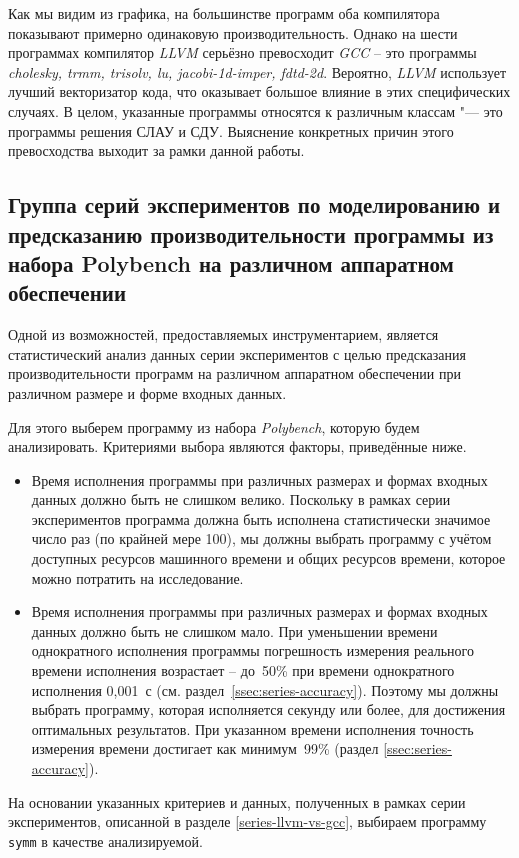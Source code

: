 Как мы видим из графика, на большинстве программ оба компилятора показывают примерно одинаковую производительность. Однако на шести программах компилятор \textit{LLVM} серьёзно превосходит \textit{GCC} -- это программы \textit{cholesky, trmm, trisolv, lu, jacobi-1d-imper, fdtd-2d}. Вероятно, \textit{LLVM} использует лучший векторизатор кода, что оказывает большое влияние в этих специфических случаях. В целом, указанные программы относятся к различным классам "--- это программы решения СЛАУ и СДУ. Выяснение конкретных причин этого превосходства выходит за рамки данной работы.

\subsection{Группа серий экспериментов по моделированию и предсказанию производительности программы из набора Polybench на различном аппаратном обеспечении}

Одной из возможностей, предоставляемых инструментарием, является статистический анализ данных серии экспериментов с целью предсказания производительности программ на различном аппаратном обеспечении при различном размере и форме входных данных.

Для этого выберем программу из набора \textit{Polybench}, которую будем анализировать. Критериями выбора являются факторы, приведённые ниже.
\begin{itemize}
    \item Время исполнения программы при различных размерах и формах входных данных должно быть не слишком велико. Поскольку в рамках серии экспериментов программа должна быть исполнена статистически значимое число раз (по крайней мере 100), мы должны выбрать программу с учётом доступных ресурсов машинного времени и общих ресурсов времени, которое можно потратить на исследование.
    \item Время исполнения программы при различных размерах и формах входных данных должно быть не слишком мало. При уменьшении времени однократного исполнения программы погрешность измерения реального времени исполнения возрастает -- до~50\% при времени однократного исполнения 0,001~с (см. раздел~\ref{ssec:series-accuracy}). Поэтому мы должны выбрать программу, которая исполняется секунду или более, для достижения оптимальных результатов. При указанном времени исполнения точность измерения времени достигает как минимум~99\% (раздел \ref{ssec:series-accuracy}).
\end{itemize}

На основании указанных критериев и данных, полученных в рамках серии экспериментов, описанной в разделе \ref{series-llvm-vs-gcc}, выбираем программу \texttt{symm} в качестве анализируемой.

